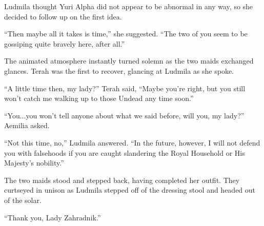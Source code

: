  

Ludmila thought Yuri Alpha did not appear to be abnormal in any way, so she decided to follow up on the first idea.

 

“Then maybe all it takes is time,” she suggested. “The two of you seem to be gossiping quite bravely here, after all.”

 

The animated atmosphere instantly turned solemn as the two maids exchanged glances. Terah was the first to recover, glancing at Ludmila as she spoke.

 

“A little time then, my lady?” Terah said, “Maybe you’re right, but you still won’t catch me walking up to those Undead any time soon.”

 

“You...you won’t tell anyone about what we said before, will you, my lady?” Aemilia asked.

 

“Not this time, no,” Ludmila answered. “In the future, however, I will not defend you with falsehoods if you are caught slandering the Royal Household or His Majesty’s nobility.”

 

The two maids stood and stepped back, having completed her outfit. They curtseyed in unison as Ludmila stepped off of the dressing stool and headed out of the solar.

 

“Thank you, Lady Zahradnik.”